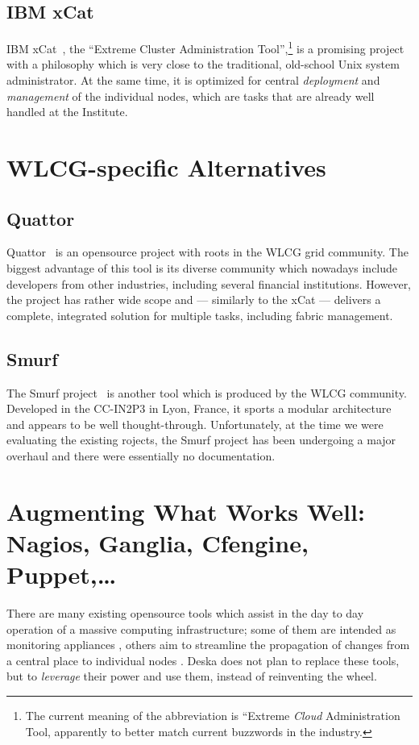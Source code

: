 \documentclass[deska]{subfiles}
\begin{document}
\subsection{IBM xCat}

IBM xCat~\cite{xcat}, the ``Extreme Cluster Administration Tool'',\footnote{The current meaning of the abbreviation is
``Extreme {\em Cloud} Administration Tool, apparently to better match current buzzwords in the industry.} is a promising
project with a philosophy which is very close to the traditional, old-school Unix system administrator.  At the same
time, it is optimized for central {\em deployment} and {\em management} of the individual nodes, which are tasks that
are already well handled at the Institute.


\section{WLCG-specific Alternatives}

\subsection{Quattor}

Quattor~\cite{quattor} is an opensource project with roots in the WLCG grid community.  The biggest advantage of this
tool is its diverse community which nowadays include developers from other industries, including several financial
institutions.  However, the project has rather wide scope and --- similarly to the xCat --- delivers a complete,
integrated solution for multiple tasks, including fabric management.

\subsection{Smurf}

The Smurf project~\cite{smurf} is another tool which is produced by the WLCG community.  Developed in the CC-IN2P3 in
Lyon, France, it sports a modular architecture and appears to be well thought-through.  Unfortunately, at the time we
were evaluating the existing rojects, the Smurf project has been undergoing a major overhaul and there were essentially
no documentation.

\section{Augmenting What Works Well: Nagios, Ganglia, Cfengine, Puppet,\ldots}

There are many existing opensource tools which assist in the day to day operation of a massive computing infrastructure;
some of them are intended as monitoring appliances \cite{munin} \cite{ganglia} \cite{nagios} \cite{mrtg}, others aim to
streamline the propagation of changes from a central place to individual nodes \cite{cfengine} \cite{puppet}.  Deska
does not plan to replace these tools, but to {\em leverage} their power and use them, instead of reinventing the wheel.
\end{document}
